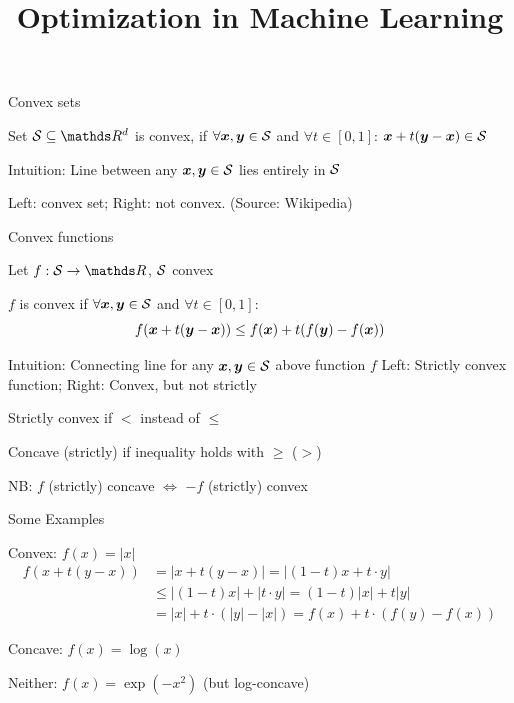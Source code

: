 \documentclass[11pt,compress,t,notes=noshow, xcolor=table]{beamer}
\title{Optimization in Machine Learning}
\begin{document}


\begin{framei}{Convex sets}
\item Set $\S \subseteq \R^d$ is convex, if $\forall \xv, \yv \in \S$ and $\forall t \in [0, 1]$:
$\xv + t (\yv - \xv) \in \S$
\item Intuition: Line between any $\xv, \yv \in \S$ lies entirely in $\S$
\item Left: convex set; Right: not convex. (Source: Wikipedia)
\end{framei}


\begin{framei}{Convex functions}
\item Let $f: \S \to \R$, $\S$ convex
\item $f$ is convex if $\forall \xv, \yv \in \S$ and $\forall t \in [0, 1]$:
$$ f(\xv + t(\yv - \xv)) \le f(\xv) + t(f(\yv) - f(\xv)) $$
\item Intuition: Connecting line for any $\xv, \yv \in \S$ above function $f$
Left: Strictly convex function; Right: Convex, but not strictly
\item Strictly convex if $<$ instead of $\le$
\item Concave (strictly) if inequality holds with $\ge$ ($>$)
\item NB: $f$ (strictly) concave $\Leftrightarrow$ $-f$ (strictly) convex
\end{framei}


\begin{framei}{Some Examples}
\item Convex: $f(x) = |x|$\\
\begin{align*}
f\left(x + t(y - x)\right) &= |x + t(y - x)| = |(1 - t) x + t \cdot y| \\
& \le |(1 - t) x| + |t \cdot y| = (1 - t) |x| + t |y| \\
&= |x| + t \cdot (|y| - |x|) = f(x) + t \cdot (f(y) - f(x))
\end{align*}
\item Concave: $f(x) = \log(x)$\\
\item Neither: $f(x) = \exp(-x^2)$ (but log-concave)
\end{framei}
\end{document}

